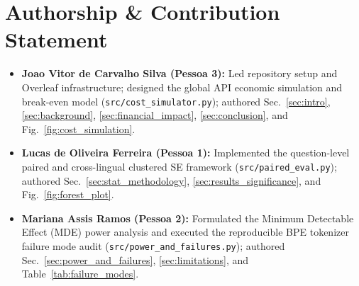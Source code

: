 \section*{Authorship \& Contribution Statement}
\begin{itemize}
    \item \textbf{Joao Vitor de Carvalho Silva (Pessoa 3):} Led repository setup and Overleaf infrastructure; designed the global API economic simulation and break-even model (\texttt{src/cost_simulator.py}); authored Sec.~\ref{sec:intro}, \ref{sec:background}, \ref{sec:financial_impact}, \ref{sec:conclusion}, and Fig.~\ref{fig:cost_simulation}.
    \item \textbf{Lucas de Oliveira Ferreira (Pessoa 1):} Implemented the question-level paired and cross-lingual clustered SE framework (\texttt{src/paired_eval.py}); authored Sec.~\ref{sec:stat_methodology}, \ref{sec:results_significance}, and Fig.~\ref{fig:forest_plot}.
    \item \textbf{Mariana Assis Ramos (Pessoa 2):} Formulated the Minimum Detectable Effect (MDE) power analysis and executed the reproducible BPE tokenizer failure mode audit (\texttt{src/power_and_failures.py}); authored Sec.~\ref{sec:power_and_failures}, \ref{sec:limitations}, and Table~\ref{tab:failure_modes}.
\end{itemize}
